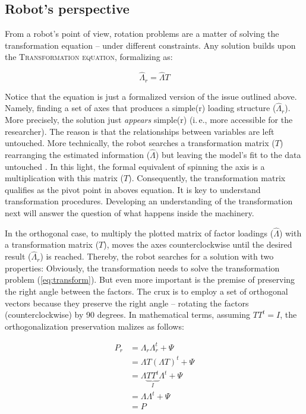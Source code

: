 \documentclass[jou, 11pt]{apa7}
\begin{document}
\subsection{Robot’s perspective}

From a robot’s point of view, rotation problems are a matter of solving the
transformation equation -- under different constraints. Any solution builds
upon the \textsc{Transformation equation}, formalizing as:

\begin{equation}
\hat{\Lambda}_r = \hat{\Lambda} {T}
\label{eq:transform}
\end{equation}

Notice that the equation is just a formalized version of the issue outlined
above. Namely, finding a set of axes that produces a simple(r) loading
structure ($\hat{\Lambda}_r$). More precisely, the solution just
\textit{appears} simple(r) (i.\,e., more accessible for the researcher). The
reason is that the relationships between variables are left untouched. More
technically, the robot searches a transformation matrix (${T}$) rearranging the
estimated information ($\hat{\Lambda}$) but leaving the model’s fit to the data
untouched \parencite{Mair2018}. In this light, the formal equivalent of
spinning the axis is a multiplication with this matrix (${T}$). Consequently,
the transformation matrix qualifies as the pivot point in aboves equation. It
is key to understand transformation procedures. Developing an understanding of
the transformation next will answer the question of what happens inside the
machinery.

In the orthogonal case, to multiply the plotted matrix of factor loadings
($\hat{\Lambda}$) with a transformation matrix ($T$), moves the axes
counterclockwise until the desired result ($\hat{\Lambda}_r$) is reached.
Thereby, the robot searches for a solution with two properties: Obviously, the
transformation needs to solve the transformation problem
(\autoref{eq:transform}). But even more important is the premise
of preserving the right angle between the factors. The crux is to employ a set
of orthogonal vectors because they preserve the right angle -- rotating the
factors (counterclockwise) by 90 degrees. In mathematical terms, assuming
$TT^t=I$, the orthogonalization preservation malizes as follows:

\begin{equation}
\begin{split}
  P_r & = \Lambda_r\Lambda_r^t + \Psi\\
  & = \Lambda T (\Lambda T)^t + \Psi \\ 
  & = \Lambda\underbrace{T T^t}_{I} \Lambda^t + \Psi \\
  & = \Lambda\Lambda^t + \Psi  \\ 
  & = P
\end{split}
\end{equation}
\end{document}
